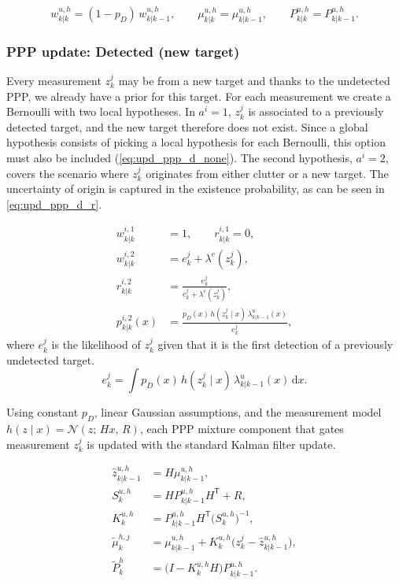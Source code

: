 \begin{equation*}
  w^{u,h}_{k|k} = (1 - p_D)\, w^{u,h}_{k|k-1}, \qquad
  \mu^{u,h}_{k|k} = \mu^{u,h}_{k|k-1}, \qquad
  P^{u,h}_{k|k} = P^{u,h}_{k|k-1}.
\end{equation*}
\medskip

\subsubsection{PPP update: Detected (new target)}
Every measurement $z^j_k$ may be from a new target and thanks to the undetected PPP, we already have a prior for this target. For each measurement we create a Bernoulli with two local hypotheses. In $a^i = 1$, $z^j_k$ is associated to a previously detected target, and the new target therefore does not exist. Since a global hypothesis consists of picking a local hypothesis for each Bernoulli, this option must also be included (\autoref{eq:upd_ppp_d_none}). The second hypothesis, $a^i = 2$, covers the scenario where $z^j_k$ originates from either clutter or a new target. The uncertainty of origin is captured in the existence probability, as can be seen in \autoref{eq:upd_ppp_d_r}.

\begin{align}
  w^{i,1}_{k|k} &= 1, \qquad r^{i,1}_{k|k} = 0, \label{eq:upd_ppp_d_none}\\
  w^{i,2}_{k|k} &= e^j_k + \lambda^c(z^j_k), \label{eq:upd_ppp_d_w}\\
  r^{i,2}_{k|k} &= \frac{e^j_k}{e^j_k + \lambda^c(z^j_k)}, \label{eq:upd_ppp_d_r}\\
  p^{i,2}_{k|k}(x) &= \frac{p_D(x)\, h(z^j_k \mid x)\, \lambda^u_{k|k-1}(x)}{e^j_k}, \label{eq:upd_ppp_d_p}
\end{align}
where $e^j_k$ is the likelihood of $z^j_k$ given that it is the first detection of a previously undetected target.
\begin{equation}
  e^j_k = \int p_D(x)\, h(z^j_k \mid x)\, \lambda^u_{k|k-1}(x)\,\mathrm{d}x .
  \label{eq:upd_ppp_d_e}
\end{equation}

Using constant $p_D$, linear Gaussian assumptions, and the measurement model $h(z \mid x) = \mathcal{N}(z;\, Hx,\, R)$, each PPP mixture component that gates measurement $z^j_k$ is updated with the standard Kalman filter update. 

\begin{align*}
  \hat z^{u,h}_{k|k-1} &= H \mu^{u,h}_{k|k-1}, \\
  S^{u,h}_k &= H P^{u,h}_{k|k-1} H^{\mathsf{T}} + R, \\
  K^{u,h}_k &= P^{u,h}_{k|k-1} H^{\mathsf{T}} \big(S^{u,h}_k\big)^{-1}, \\
  \tilde\mu^{h,j}_k &= \mu^{u,h}_{k|k-1} + K^{u,h}_k \big(z^j_k - \hat z^{u,h}_{k|k-1}\big), \\
  \tilde P^{h}_k &= \big(I - K^{u,h}_k H\big) P^{u,h}_{k|k-1}.
\end{align*}

